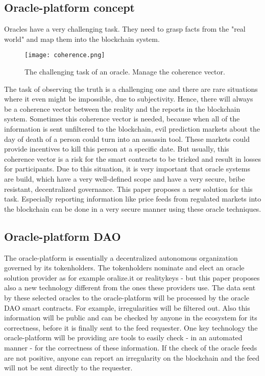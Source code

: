 \documentclass[a4paper]{article}
\begin{document}
\subsection{Oracle-platform concept}
Oracles have a very challenging task. They need to grasp facts from the "real world" and map them into the blockchain system.
\begin{figure}
\centering
\texttt{[image: coherence.png]}
\caption{\label{fig:coherence}The challenging task of an oracle. Manage the coherence vector.}
\end{figure}
The task of observing the truth is a challenging one and there are rare situations where it even might be impossible, due to subjectivity. Hence, there will always be a coherence vector between the reality and the reports in the blockchain system. 
Sometimes this coherence vector is needed, because when all of the information is sent unfiltered to the blockchain, evil prediction markets about the day of death of a person could turn into an assassin tool. These markets could provide incentives to kill this person at a specific date. But usually, this coherence vector is a risk for the smart contracts to be tricked and result in losses for participants. Due to this situation, it is very important that oracle systems are build, which have a very well-defined scope and have a very secure, bribe resistant, decentralized governance. This paper proposes a new solution for this task. Especially reporting information like price feeds from regulated markets into the blockchain can be done in a very secure manner using these oracle techniques.

\subsection{Oracle-platform DAO}
The oracle-platform is essentially a decentralized autonomous organization governed by its tokenholders. The tokenholders nominate and elect an oracle solution provider as for example oralize.it or realitykeys - but this paper proposes also a new technology different from the ones these providers use. The data sent by these selected oracles to the oracle-platform  will be processed by the oracle DAO smart contracts. For example, irregularities will be filtered out.  Also this information will be public and can be checked by anyone in the ecosystem for its correctness, before it is finally sent to the feed requester. One key technology the oracle-platform will be providing are tools to easily check - in an automated manner - for the correctness of these information. If the check of the oracle feeds are not positive, anyone can report an irregularity on the blockchain and the feed will not be sent directly to the requester.
\end{document}
